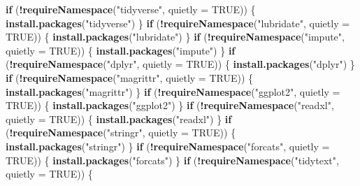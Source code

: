 \documentclass[
]{article}
\newenvironment{Shaded}{\begin{snugshade}}{\end{snugshade}}
\newcommand{\AttributeTok}[1]{\textcolor[rgb]{0.13,0.29,0.53}{#1}}
\newcommand{\ConstantTok}[1]{\textcolor[rgb]{0.56,0.35,0.01}{#1}}
\newcommand{\ControlFlowTok}[1]{\textcolor[rgb]{0.13,0.29,0.53}{\textbf{#1}}}
\newcommand{\FunctionTok}[1]{\textcolor[rgb]{0.13,0.29,0.53}{\textbf{#1}}}
\newcommand{\NormalTok}[1]{#1}
\newcommand{\SpecialCharTok}[1]{\textcolor[rgb]{0.81,0.36,0.00}{\textbf{#1}}}
\newcommand{\StringTok}[1]{\textcolor[rgb]{0.31,0.60,0.02}{#1}}
\begin{document}
\begin{Shaded}
\begin{Highlighting}[]
\ControlFlowTok{if}\NormalTok{ (}\SpecialCharTok{!}\FunctionTok{requireNamespace}\NormalTok{(}\StringTok{"tidyverse"}\NormalTok{, }\AttributeTok{quietly =} \ConstantTok{TRUE}\NormalTok{)) \{}
  \FunctionTok{install.packages}\NormalTok{(}\StringTok{"tidyverse"}\NormalTok{)}
\NormalTok{\}}
\ControlFlowTok{if}\NormalTok{ (}\SpecialCharTok{!}\FunctionTok{requireNamespace}\NormalTok{(}\StringTok{"lubridate"}\NormalTok{, }\AttributeTok{quietly =} \ConstantTok{TRUE}\NormalTok{)) \{}
  \FunctionTok{install.packages}\NormalTok{(}\StringTok{"lubridate"}\NormalTok{)}
\NormalTok{\}}
\ControlFlowTok{if}\NormalTok{ (}\SpecialCharTok{!}\FunctionTok{requireNamespace}\NormalTok{(}\StringTok{"impute"}\NormalTok{, }\AttributeTok{quietly =} \ConstantTok{TRUE}\NormalTok{)) \{}
  \FunctionTok{install.packages}\NormalTok{(}\StringTok{"impute"}\NormalTok{)}
\NormalTok{\}}
\ControlFlowTok{if}\NormalTok{ (}\SpecialCharTok{!}\FunctionTok{requireNamespace}\NormalTok{(}\StringTok{"dplyr"}\NormalTok{, }\AttributeTok{quietly =} \ConstantTok{TRUE}\NormalTok{)) \{}
  \FunctionTok{install.packages}\NormalTok{(}\StringTok{"dplyr"}\NormalTok{)}
\NormalTok{\}}
\ControlFlowTok{if}\NormalTok{ (}\SpecialCharTok{!}\FunctionTok{requireNamespace}\NormalTok{(}\StringTok{"magrittr"}\NormalTok{, }\AttributeTok{quietly =} \ConstantTok{TRUE}\NormalTok{)) \{}
  \FunctionTok{install.packages}\NormalTok{(}\StringTok{"magrittr"}\NormalTok{)}
\NormalTok{\}}
\ControlFlowTok{if}\NormalTok{ (}\SpecialCharTok{!}\FunctionTok{requireNamespace}\NormalTok{(}\StringTok{"ggplot2"}\NormalTok{, }\AttributeTok{quietly =} \ConstantTok{TRUE}\NormalTok{)) \{}
  \FunctionTok{install.packages}\NormalTok{(}\StringTok{"ggplot2"}\NormalTok{)}
\NormalTok{\}}
\ControlFlowTok{if}\NormalTok{ (}\SpecialCharTok{!}\FunctionTok{requireNamespace}\NormalTok{(}\StringTok{"readxl"}\NormalTok{, }\AttributeTok{quietly =} \ConstantTok{TRUE}\NormalTok{)) \{}
  \FunctionTok{install.packages}\NormalTok{(}\StringTok{"readxl"}\NormalTok{)}
\NormalTok{\}}
\ControlFlowTok{if}\NormalTok{ (}\SpecialCharTok{!}\FunctionTok{requireNamespace}\NormalTok{(}\StringTok{"stringr"}\NormalTok{, }\AttributeTok{quietly =} \ConstantTok{TRUE}\NormalTok{)) \{}
  \FunctionTok{install.packages}\NormalTok{(}\StringTok{"stringr"}\NormalTok{)}
\NormalTok{\}}
\ControlFlowTok{if}\NormalTok{ (}\SpecialCharTok{!}\FunctionTok{requireNamespace}\NormalTok{(}\StringTok{"forcats"}\NormalTok{, }\AttributeTok{quietly =} \ConstantTok{TRUE}\NormalTok{)) \{}
  \FunctionTok{install.packages}\NormalTok{(}\StringTok{"forcats"}\NormalTok{)}
\NormalTok{\}}
\ControlFlowTok{if}\NormalTok{ (}\SpecialCharTok{!}\FunctionTok{requireNamespace}\NormalTok{(}\StringTok{"tidytext"}\NormalTok{, }\AttributeTok{quietly =} \ConstantTok{TRUE}\NormalTok{)) \{}

\end{Highlighting}
\end{Shaded}
\end{document}
